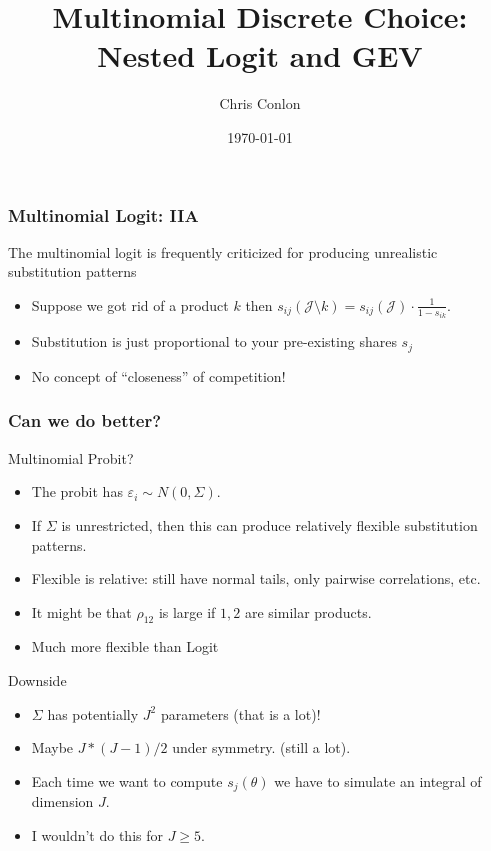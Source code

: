 

\title{Multinomial Discrete Choice: Nested Logit and GEV}
\author{Chris Conlon}
\date{\today}

\frame{\titlepage}

\begin{frame}
\frametitle{Multinomial Logit: IIA}
The multinomial logit is frequently criticized for producing unrealistic substitution patterns
\begin{itemize}
\item Suppose we got rid of a product $k$ then $s_{ij}(\mathcal{J}\setminus k) = s_{ij}(\mathcal{J})\cdot \frac{1}{1- s_{ik}}$.
\item Substitution is just proportional to your pre-existing shares $s_j$
\item No concept of ``closeness'' of competition!
\end{itemize}
\end{frame}


\begin{frame}
\frametitle{Can we do better?}
Multinomial Probit?
\begin{itemize}
\item The probit has $\varepsilon_i \sim N(0,\Sigma)$.
\item If $\Sigma$ is unrestricted, then this can produce relatively flexible substitution patterns.
\item Flexible is relative: still have normal tails, only pairwise correlations, etc.
\item It might be that $\rho_{12}$ is large if $1,2$ are similar products.
\item Much more flexible than Logit
\end{itemize}
Downside
\begin{itemize}
\item $\Sigma$ has potentially $J^2$ parameters (that is a lot)!
\item Maybe $J * (J-1)/2$ under symmetry. (still a lot).
\item Each time we want to compute $s_j(\theta)$ we have to simulate an integral of dimension $J$.
\item I wouldn't do this for $J \geq 5$.
\end{itemize}
\end{frame}




